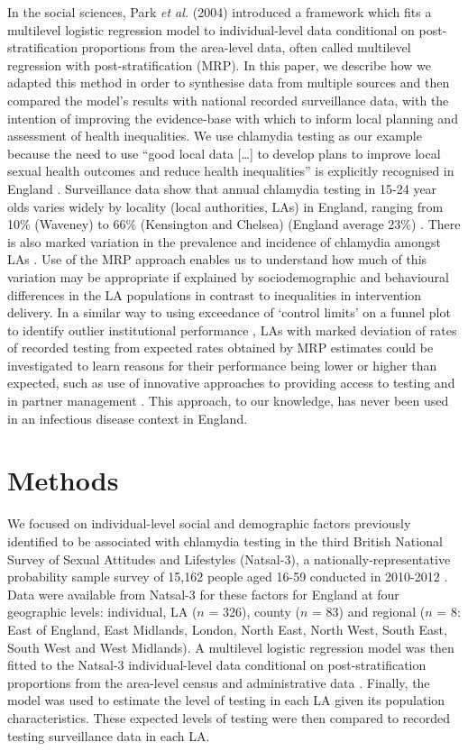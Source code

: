 \documentclass[fleqn,10pt]{wlscirep}
\begin{document}
In the social sciences, Park {\it et al.} (2004) \cite{Park2004} introduced a framework which fits a multilevel logistic regression model to individual-level data conditional on post-stratification proportions from the area-level data, often called multilevel regression with post-stratification (MRP). In this paper, we describe how we adapted this method \cite{Park2004} in order to synthesise data from multiple sources and then compared the model’s results with national recorded surveillance data, with the intention of improving the evidence-base with which to inform local planning and assessment of health inequalities. We use chlamydia testing as our example because the need to use “good local data […] to develop plans to improve local sexual health outcomes and reduce health inequalities” is explicitly recognised in England \cite{DepartmentofHealth2013}. Surveillance data show that annual chlamydia testing in 15-24 year olds varies widely by locality (local authorities, LAs) in England, ranging from 10\% (Waveney) to 66\% (Kensington and Chelsea) (England average 23\%) \cite{fingertips}. There is also marked variation in the prevalence and incidence of chlamydia amongst LAs \cite{Lewis2017}. Use of the MRP approach enables us to understand how much of this variation may be appropriate if explained by sociodemographic and behavioural differences in the LA populations in contrast to inequalities in intervention delivery. In a similar way to using exceedance of ‘control limits’ on a funnel plot to identify outlier institutional performance \cite{Spiegelhalter2005}, LAs with marked deviation of rates of recorded testing from expected rates obtained by MRP estimates could be investigated to learn reasons for their performance being lower or higher than expected, such as use of innovative approaches to providing access to testing \cite{Estcourt2016} and in partner management \cite{Althaus2014}. This approach, to our knowledge, has never been used in an infectious disease context in England.

\section*{Methods}

We focused on individual-level social and demographic factors previously identified to be associated with chlamydia testing in the third British National Survey of Sexual Attitudes and Lifestyles (Natsal-3), a nationally-representative probability sample survey of 15,162 people aged 16-59 conducted in 2010-2012 \cite{Erens2014,Johnson2017}. Data were available from Natsal-3 for these factors for England at four geographic levels: individual, LA ($n$ = 326), county ($n$ = 83) and regional ($n$ = 8: East of England, East Midlands, London, North East, North West, South East, South West and West Midlands). A multilevel logistic regression model was then fitted to the Natsal-3 individual-level data conditional on post-stratification proportions from the area-level census and administrative data \cite{Park2004}. Finally, the model was used to estimate the level of testing in each LA given its population characteristics. These expected levels of testing were then compared to recorded testing surveillance data in each LA.
\end{document}
